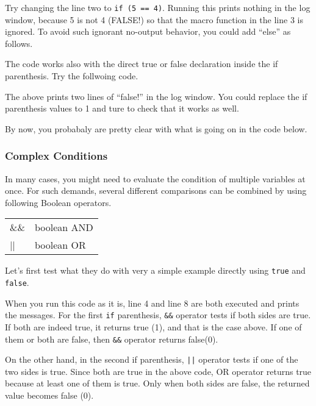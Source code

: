 \documentclass[11pt,a4paper,oneside]{report}
\newenvironment{indentCom}%
{\begin{list}{}%
         {\setlength{\leftmargin}{1em}}%
         \item[]%
}
{\end{list}}
\newcommand{\ilcom}[1]{\texttt{\small#1}}
\begin{document}
Try changing the line two to \ilcom{if (5 == 4)}. Running this prints nothing
in the log window, because 5 is not 4 (FALSE!) so that the macro function in
the line 3 is ignored. To avoid such ignorant no-output behavior, you could add
``else'' as follows.



The code works also with the direct true or false
declaration inside the if parenthesis. Try the follwoing code.



The above prints two lines of ``false!'' in the log window. You could replace
the if parenthesis values to 1 and ture to check that it works as well. 

By now, you probabaly are pretty clear with what is going on in the code below. 


\subsubsection{Complex Conditions}
In many cases, you might need to evaluate the condition of multiple variables at once. 
For such demands, several different comparisons can be combined by using following Boolean operators. 

\begin{indentCom}
 \begin{tabular*}{0.5\textwidth}{ l l }
\&\& & boolean AND\\
|| & boolean OR\\
\end{tabular*}
\end{indentCom}

Let's first test what they do with very a simple example directly using
\ilcom{true} and \ilcom{false}.

When you run this code as it is, line 4 and line 8 are both executed and prints
the messages. For the first \ilcom{if} parenthesis, \ilcom{\&\&} operator tests if
both sides are true. If both are indeed true, it returns true (1), and that is
the case above. If one of them or both are false, then \ilcom{\&\&}
operator returns false(0). 

On the other hand, in the second if parenthesis,
\ilcom{||} operator tests if one of the two sides is true. Since both are
true in the above code, OR operator returns true because at least one of them is
true. Only when both sides are false, the returned value becomes false (0).
\end{document}
